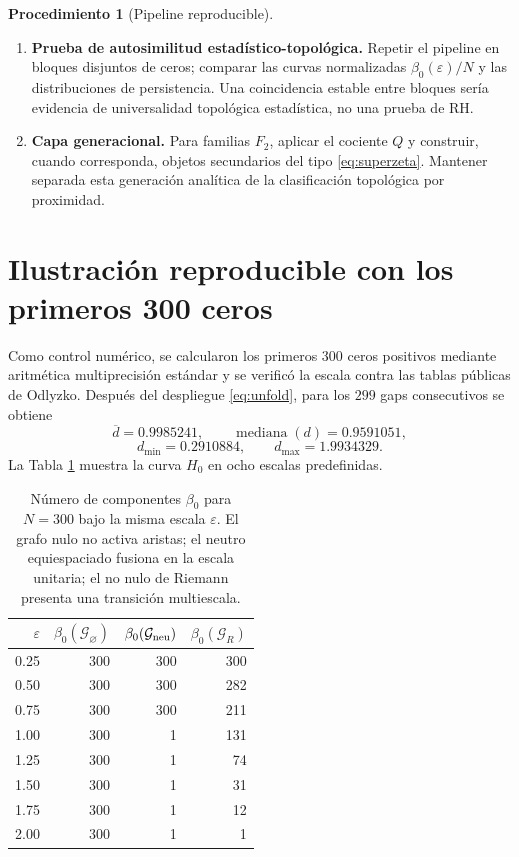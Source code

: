 \documentclass[11pt]{amsart}
\theoremstyle{definition}
\newtheorem{algorithmicdef}[theorem]{Procedimiento}
\theoremstyle{remark}
\begin{document}
\begin{algorithmicdef}[Pipeline reproducible]
\begin{enumerate}[label=\textbf{Paso \arabic*.},leftmargin=*]
\[
\mathcal B_{\varnothing}(\varepsilon),\quad
\mathcal B_{\rm neu}(\varepsilon),\quad
\mathcal B_R(\varepsilon),
\]
donde $\mathcal B=\beta_0$.
\item \textbf{Prueba de autosimilitud estadístico-topológica.} Repetir el pipeline en bloques disjuntos de ceros; comparar las curvas normalizadas $\beta_0(\varepsilon)/N$ y las distribuciones de persistencia. Una coincidencia estable entre bloques sería evidencia de universalidad topológica estadística, no una prueba de RH.
\item \textbf{Capa generacional.} Para familias $F_2$, aplicar el cociente $Q$ y construir, cuando corresponda, objetos secundarios del tipo \eqref{eq:superzeta}. Mantener separada esta generación analítica de la clasificación topológica por proximidad.
\end{enumerate}
\end{algorithmicdef}

\section{Ilustración reproducible con los primeros 300 ceros}
Como control numérico, se calcularon los primeros $300$ ceros positivos mediante aritmética multiprecisión estándar y se verificó la escala contra las tablas públicas de Odlyzko. Después del despliegue \eqref{eq:unfold}, para los $299$ gaps consecutivos se obtiene
\begin{equation}
 \overline d=0.9985241,\qquad
 \operatorname{mediana}(d)=0.9591051,
\end{equation}
\begin{equation}
 d_{\min}=0.2910884,\qquad d_{\max}=1.9934329.
\end{equation}
La Tabla \ref{tab:beta} muestra la curva $H_0$ en ocho escalas predefinidas.

\begin{table}[t]
\centering
\caption{Número de componentes $\beta_0$ para $N=300$ bajo la misma escala $\varepsilon$. El grafo nulo no activa aristas; el neutro equiespaciado fusiona en la escala unitaria; el no nulo de Riemann presenta una transición multiescala.}
\label{tab:beta}
\begin{tabular}{rrrr}
\toprule
$\varepsilon$ & $\beta_0(\mathcal G_{\varnothing})$ & $\beta_0(\mathcal G_{\rm neu})$ & $\beta_0(\mathcal G_R)$\\
\midrule
0.25 & 300 & 300 & 300\\
0.50 & 300 & 300 & 282\\
0.75 & 300 & 300 & 211\\
1.00 & 300 & 1   & 131\\
1.25 & 300 & 1   & 74\\
1.50 & 300 & 1   & 31\\
1.75 & 300 & 1   & 12\\
2.00 & 300 & 1   & 1\\
\bottomrule
\end{tabular}
\end{table}
\end{document}
